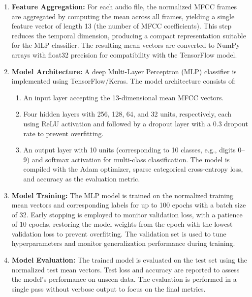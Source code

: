 \documentclass[12pt]{article}
\begin{document}
\begin{enumerate}
    \item \textbf{Feature Aggregation:} For each audio file, the normalized MFCC frames are aggregated by computing the mean across all frames, yielding a single feature vector of length 13 (the number of MFCC coefficients). This step reduces the temporal dimension, producing a compact representation suitable for the MLP classifier. The resulting mean vectors are converted to NumPy arrays with float32 precision for compatibility with the TensorFlow model.


    \item \textbf{Model Architecture:} A deep Multi-Layer Perceptron (MLP) classifier is implemented using TensorFlow/Keras. The model architecture consists of:

    \begin{enumerate}
        \item An input layer accepting the 13-dimensional mean MFCC vectors.
        \item Four hidden layers with 256, 128, 64, and 32 units, respectively, each using ReLU activation and followed by a dropout layer with a 0.3 dropout rate to prevent overfitting.
        \item An output layer with 10 units (corresponding to 10 classes, e.g., digits 0–9) and softmax activation for multi-class classification. The model is compiled with the Adam optimizer, sparse categorical cross-entropy loss, and accuracy as the evaluation metric.
    \end{enumerate}


    \item \textbf{Model Training:} The MLP model is trained on the normalized training mean vectors and corresponding labels for up to 100 epochs with a batch size of 32. Early stopping is employed to monitor validation loss, with a patience of 10 epochs, restoring the model weights from the epoch with the lowest validation loss to prevent overfitting. The validation set is used to tune hyperparameters and monitor generalization performance during training.

    \item \textbf{Model Evaluation:} The trained model is evaluated on the test set using the normalized test mean vectors. Test loss and accuracy are reported to assess the model’s performance on unseen data. The evaluation is performed in a single pass without verbose output to focus on the final metrics.

\end{enumerate}
\end{document}
